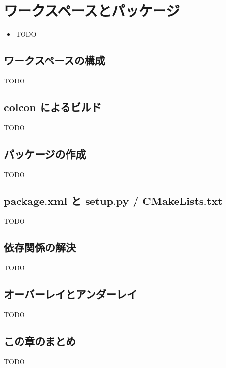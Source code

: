 \chapter{ワークスペースとパッケージ}
\label{chap:workspace}

\begin{goalbox}
  \begin{itemize}
    \item TODO
  \end{itemize}
\end{goalbox}

\section{ワークスペースの構成}

TODO

\section{colcon によるビルド}

TODO

\section{パッケージの作成}

TODO

\section{package.xml と setup.py / CMakeLists.txt}

TODO

\section{依存関係の解決}

TODO

\section{オーバーレイとアンダーレイ}

TODO

\section*{この章のまとめ}

TODO
